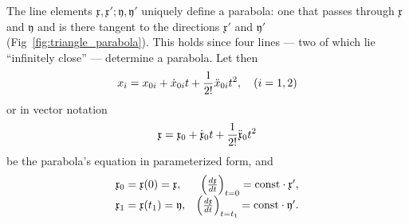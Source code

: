 \documentclass[11pt]{book} \usepackage{amssymb}
\newcommand{\myvec}[1]{\mathfrak{#1}}
\begin{document}
The line elements $\myvec{x},\myvec{x}';\myvec{y},\myvec{y}'$ uniquely define
a parabola: one that passes through  $\myvec{x}$ and $\myvec{y}$ and is there
tangent to the directions $\myvec{x}'$ and $\myvec{y}'$ 
(Fig~\ref{fig:triangle_parabola}). This holds since four lines --- two of
which lie ``infinitely close'' --- determine a parabola. Let then
\begin{equation}
  \label{eq:parabola_def1}
  x_i=x_{0i}+\dot{x}_{0i}t+{1\over 2!}\ddot{x}_{0i}t^2, \quad(i=1,2)
\end{equation}
or in vector notation
\begin{equation}
  \label{eq:parabola_def2}
  \myvec{x}=\myvec{x}_0+\dot{\myvec{x}}_0t+{1\over 2!}\ddot{\myvec{x}}_0t^2
\end{equation}
be the parabola's equation in parameterized form, and
\begin{equation}
  \label{eq:parabola_initial_def}
  \begin{array}{lrcl}
    \myvec{x}_0=\myvec{x}(0)=\myvec{x},& \left({d\myvec{x}\over dt}\right)_{t=0}=\mbox{const}\cdot \myvec{x}',\\
    \myvec{x}_1=\myvec{x}(t_1)=\myvec{y},& \left({d\myvec{x}\over dt}\right)_{t=t_1}=\mbox{const}\cdot \myvec{y}'.\\
  \end{array}  
\end{equation}



 
\end{document}
